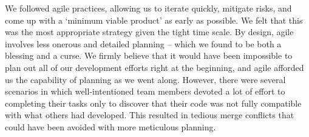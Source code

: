 We followed agile practices, allowing us to iterate quickly, mitigate risks, and come up with a `minimum viable product’ as early as possible. We felt that this was the most appropriate strategy given the tight time scale. By design, agile involves less onerous and detailed planning -- which we found to be both a blessing and a curse. We firmly believe that it would have been impossible to plan out all of our development efforts right at the beginning, and agile afforded us the capability of planning as we went along. However, there were several scenarios in which well-intentioned team members devoted a lot of effort to completing their tasks only to discover that their code was not fully compatible with what others had developed. This resulted in tedious merge conflicts that could have been avoided with more meticulous planning.

